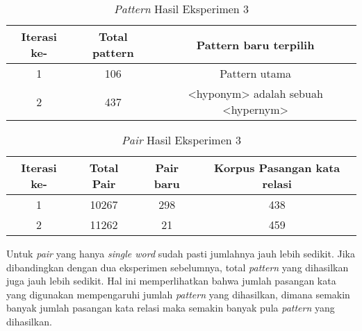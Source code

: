 \begin{table}
  \centering
  \caption{\textit{Pattern} Hasil Eksperimen 3}
  \label{table:eksp3-pattern}
  \begin{tabular}{|c|c|c|}
  \hline
    Iterasi ke- & Total pattern & Pattern baru terpilih \\ \hline
    1 & 106 & Pattern utama \\ \hline
    2 & 437 & <hyponym> adalah sebuah <hypernym> \\ \hline
  \end{tabular} 
\end{table}

\begin{table}
  \centering
  \caption{\textit{Pair} Hasil Eksperimen 3}
  \label{table:eksp3-pair}
  \begin{tabular}{|c|c|c|c|}
  \hline
  Iterasi ke-  & Total Pair & Pair baru & Korpus Pasangan kata relasi \\ \hline
  1 & 10267 & 298 & 438 \\ \hline
  2 & 11262 & 21 & 459 \\ \hline
  \end{tabular} 
\end{table}

\noindent Untuk \textit{pair} yang hanya \textit{single word} sudah pasti jumlahnya jauh lebih sedikit. Jika dibandingkan dengan dua eksperimen sebelumnya, total \textit{pattern} yang dihasilkan juga jauh lebih sedikit. Hal ini memperlihatkan bahwa jumlah pasangan kata yang digunakan mempengaruhi jumlah \textit{pattern} yang dihasilkan, dimana semakin banyak jumlah pasangan kata relasi maka semakin banyak pula \textit{pattern} yang dihasilkan.
%

